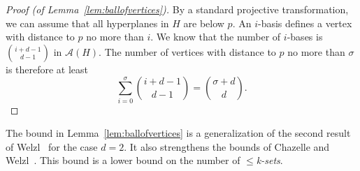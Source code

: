 \documentclass{patmorin}
\begin{document}
\begin{proof}[Proof (of Lemma~\ref{lem:ballofvertices})]
By a standard projective transformation, we can assume that all hyperplanes in $H$ are below $p$. %
An $i$-basis defines a vertex with distance to $p$ no more than $i$. We know that the number of $i$-bases is $\binom{i+d-1}{d-1}$ in $\mathcal{A}(H)$. The number of vertices with distance to $p$ no more than $\sigma$ is therefore at least
\[ \sum_{i=0}^{\sigma}\binom{i+d-1}{d-1} = \binom{\sigma+d}{d} .\]
\end{proof}

The bound in Lemma~\ref{lem:ballofvertices} is a generalization of the second result of Welzl~\cite{welzl92} for the case $d = 2$. It also strengthens the bounds of Chazelle and Welzl~\cite{Chazelle89}. This bound is a lower bound on the number of \emph{$\leq$k-sets}.

\end{document}
